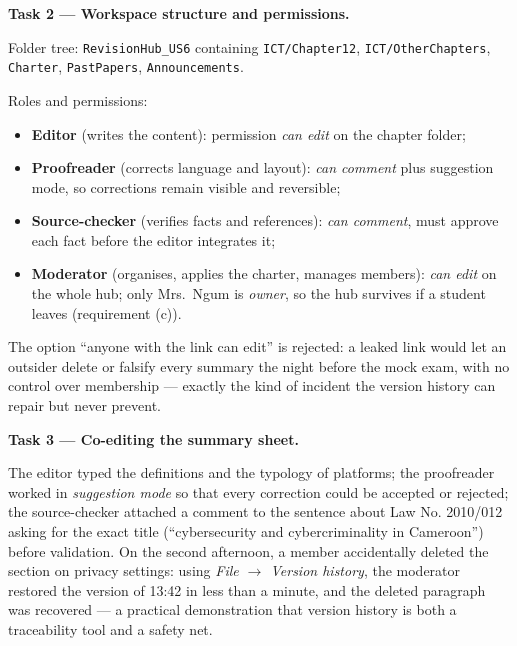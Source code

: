 \documentclass[11pt]{article}
\begin{document}
\textbf{Task 2 — Workspace structure and permissions.}\par
Folder tree: \texttt{RevisionHub\_US6} containing \texttt{ICT/Chapter12}, \texttt{ICT/OtherChapters}, \texttt{Charter}, \texttt{PastPapers}, \texttt{Announcements}.

Roles and permissions:
\begin{itemize}
\item \textbf{Editor} (writes the content): permission \emph{can edit} on the chapter folder;
\item \textbf{Proofreader} (corrects language and layout): \emph{can comment} plus suggestion mode, so corrections remain visible and reversible;
\item \textbf{Source-checker} (verifies facts and references): \emph{can comment}, must approve each fact before the editor integrates it;
\item \textbf{Moderator} (organises, applies the charter, manages members): \emph{can edit} on the whole hub; only Mrs.\ Ngum is \emph{owner}, so the hub survives if a student leaves (requirement (c)).
\end{itemize}
The option ``anyone with the link can edit'' is rejected: a leaked link would let an outsider delete or falsify every summary the night before the mock exam, with no control over membership — exactly the kind of incident the version history can repair but never prevent.

\textbf{Task 3 — Co-editing the summary sheet.}\par
The editor typed the definitions and the typology of platforms; the proofreader worked in \emph{suggestion mode} so that every correction could be accepted or rejected; the source-checker attached a comment to the sentence about Law No. 2010/012 asking for the exact title (``cybersecurity and cybercriminality in Cameroon'') before validation. On the second afternoon, a member accidentally deleted the section on privacy settings: using \emph{File $\rightarrow$ Version history}, the moderator restored the version of 13:42 in less than a minute, and the deleted paragraph was recovered — a practical demonstration that version history is both a traceability tool and a safety net.
\end{document}
